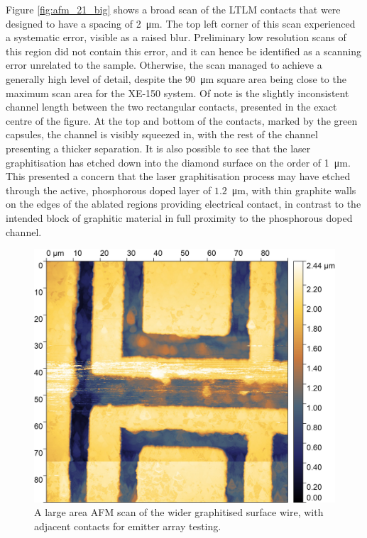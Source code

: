 \begin{refsection}
Figure \ref{fig:afm_21_big} shows a broad scan of the LTLM contacts that were designed to have a spacing of 2~\si{\micro\metre}. The top left corner of this scan experienced a systematic error, visible as a raised blur. Preliminary low resolution scans of this region did not contain this error, and it can hence be identified as a scanning error unrelated to the sample. Otherwise, the scan managed to achieve a generally high level of detail, despite the 90~\si{\micro\metre} square area being close to the maximum scan area for the XE-150 system. Of note is the slightly inconsistent channel length between the two rectangular contacts, presented in the exact centre of the figure. At the top and bottom of the contacts, marked by the green capsules, the channel is visibly squeezed in, with the rest of the channel presenting a thicker separation. It is also possible to see that the laser graphitisation has etched down into the diamond surface on the order of 1~\si{\micro\metre}. This presented a concern that the laser graphitisation process may have etched through the active, phosphorous doped layer of $1.2$~\si{\micro\metre}, with thin graphite walls on the edges of the ablated regions providing electrical contact, in contrast to the intended block of graphitic material in full proximity to the phosphorous doped channel.

\begin{figure}[H]
    \centering
    \includegraphics[width=\textwidth]{Chapter7/Figs/Raster/bone_scan_whiteh_downscaled.jpg}
    \caption{A large area AFM scan of the wider graphitised surface wire, with adjacent contacts for emitter array testing.}
    \label{fig:afm_bone}
\end{figure}


\end{refsection}
